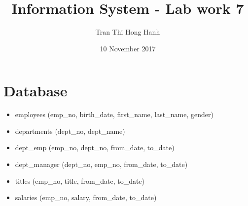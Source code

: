 \documentclass{article}
\title{Information System - Lab work 7}
\author{Tran Thi Hong Hanh}
\date{10 November 2017}
\begin{document}
\maketitle
\section*{Database}
\begin{itemize}
	\item employees (emp\_no, birth\_date, first\_name, last\_name, gender)
	\item departments (dept\_no, dept\_name)
	\item dept\_emp (emp\_no, dept\_no, from\_date, to\_date)
	\item dept\_manager (dept\_no, emp\_no, from\_date, to\_date)
	\item titles (emp\_no, title, from\_date, to\_date)
	\item salaries (emp\_no, salary, from\_date, to\_date)
\end{itemize}
\end{document}
